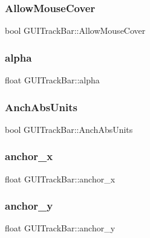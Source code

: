 \subsubsection{\texorpdfstring{Allow\+Mouse\+Cover}{AllowMouseCover}}
{\footnotesize\ttfamily bool G\+U\+I\+Track\+Bar\+::\+Allow\+Mouse\+Cover}

\hypertarget{class_g_u_i_track_bar_ac67d0f9b5a499c0a1d4df320c45028cd}{}\label{class_g_u_i_track_bar_ac67d0f9b5a499c0a1d4df320c45028cd} 
\subsubsection{\texorpdfstring{alpha}{alpha}}
{\footnotesize\ttfamily float G\+U\+I\+Track\+Bar\+::alpha}

\hypertarget{class_g_u_i_track_bar_a72ef7138c5bcecc8abbc5bb7257291ed}{}\label{class_g_u_i_track_bar_a72ef7138c5bcecc8abbc5bb7257291ed} 
\subsubsection{\texorpdfstring{Anch\+Abs\+Units}{AnchAbsUnits}}
{\footnotesize\ttfamily bool G\+U\+I\+Track\+Bar\+::\+Anch\+Abs\+Units}

\hypertarget{class_g_u_i_track_bar_a05254ae83894460b85c3cabe7bc45b7b}{}\label{class_g_u_i_track_bar_a05254ae83894460b85c3cabe7bc45b7b} 
\subsubsection{\texorpdfstring{anchor\+\_\+x}{anchor\_x}}
{\footnotesize\ttfamily float G\+U\+I\+Track\+Bar\+::anchor\+\_\+x}

\hypertarget{class_g_u_i_track_bar_a8a771c9a32d90b1e444e81a4d57aef42}{}\label{class_g_u_i_track_bar_a8a771c9a32d90b1e444e81a4d57aef42} 
\subsubsection{\texorpdfstring{anchor\+\_\+y}{anchor\_y}}
{\footnotesize\ttfamily float G\+U\+I\+Track\+Bar\+::anchor\+\_\+y}

